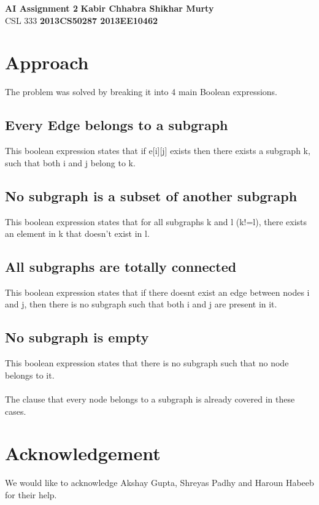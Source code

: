 \documentclass[a4paper, 10pt]{article}
\begin{document}
\noindent
\large\textbf{AI Assignment 2} \hfill \textbf{Kabir Chhabra Shikhar Murty} \\
\large CSL  333 \hfill \textbf{ 2013CS50287 2013EE10462} 



\section{Approach}
The problem was solved by breaking it into 4 main Boolean expressions.


\subsection{Every Edge belongs to a subgraph}
This boolean expression states that if e[i][j] exists then there exists a subgraph k, such that both i and j belong to k.

\subsection{No subgraph is a subset of another subgraph}
This boolean expression states that for all subgraphs k and l (k!=l), there exists an element in k that doesn't exist in l.

\subsection{All subgraphs are totally connected}
This boolean expression states that if there doesnt exist an edge between nodes i and j, then there is no subgraph such that both i and j are present in it.


\subsection{No subgraph is empty}
This boolean expression states that there is no subgraph such that no node belongs to it.\\\\
The clause that every node belongs to a subgraph is already covered in these cases.

\section{Acknowledgement}
We would like to acknowledge Akshay Gupta, Shreyas Padhy and Haroun Habeeb for their help.
\end{document}
